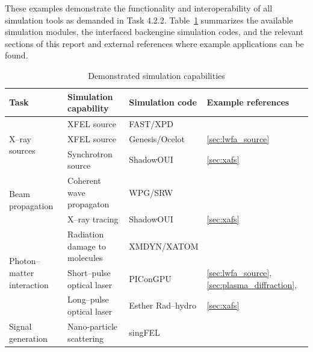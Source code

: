 \documentclass[12pt]{scrartcl}
\begin{document}
These examples demonstrate the functionality and interoperability of all
simulation tools as demanded in Task 4.2.2.
Table~\ref{tab:simulation_capabilities} summarizes the available simulation
modules, the interfaced backengine simulation codes, and the relevant sections
of this report and external references where example applications can be found.

\begin{table}
  \begin{center}
    \scriptsize
    \caption{Demonstrated simulation capabilities}
    \label{tab:simulation_capabilities}
  \begin{tabular}[ht]{|l|l|l|l|}
    \hline
      \textbf{Task} &
      \textbf{Simulation capability} &
      \textbf{Simulation code}     &
      \textbf{Example references}    \\
    \hline
    \hline
      \multirow{3}{*}{X--ray sources}
      & XFEL source                     & FAST/XPD              & \cite{EUCALL_SIMEX_M4.1,EUCALL_SIMEX_M4.2,Fortmann-Grote2017}     \\
      & XFEL source                     & Genesis/Ocelot        & \ref{sec:lwfa_source} \\
      & Synchrotron source              & ShadowOUI             & \ref{sec:xafs}       \\
    \hline
    \multirow{2}{*}{Beam propagation}
      & Coherent wave propagaton        & WPG/SRW               & \cite{EUCALL_SIMEX_M4.1,EUCALL_SIMEX_M4.2,Fortmann-Grote2017}     \\
      & X--ray tracing                  & ShadowOUI             & \ref{sec:xafs}       \\
    \hline
    \multirow{3}{*}{Photon--matter interaction}
      & Radiation damage to molecules   & XMDYN/XATOM           & \cite{EUCALL_SIMEX_M4.1,EUCALL_SIMEX_M4.2,Fortmann-Grote2017}     \\
      & Short--pulse optical laser      & PIConGPU              & \ref{sec:lwfa_source},\ref{sec:plasma_diffraction},\cite{EUCALL_SIMEX_D4.1}  \\
      & Long--pulse optical laser       & Esther Rad--hydro     & \ref{sec:xafs} \cite{Torchio2016}  \\
    \hline
    \multirow{5}{*}{Signal generation}
      & Nano-particle scattering        & singFEL               & \cite{EUCALL_SIMEX_M4.1,EUCALL_SIMEX_M4.2,Fortmann-Grote2017}     \\


\end{tabular}
\end{center}
\end{table}
\end{document}
